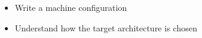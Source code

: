 {
  \begin{itemize}
    \item Write a machine configuration
    \item Understand how the target architecture is chosen
  \end{itemize}
}
